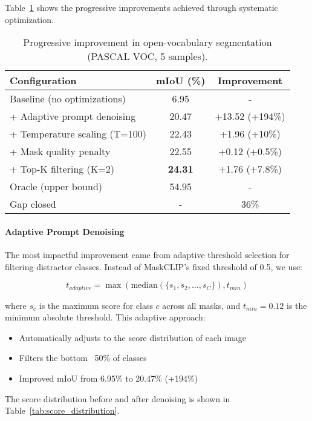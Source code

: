 Table~\ref{tab:optimization_progressive} shows the progressive improvements achieved through systematic optimization.

\begin{table}[h]
\centering
\caption{Progressive improvement in open-vocabulary segmentation (PASCAL VOC, 5 samples).}
\label{tab:optimization_progressive}
\begin{tabular}{lcc}
\hline
\textbf{Configuration} & \textbf{mIoU (\%)} & \textbf{Improvement} \\
\hline
Baseline (no optimizations) & 6.95 & - \\
+ Adaptive prompt denoising & 20.47 & +13.52 (+194\%) \\
+ Temperature scaling (T=100) & 22.43 & +1.96 (+10\%) \\
+ Mask quality penalty & 22.55 & +0.12 (+0.5\%) \\
+ Top-K filtering (K=2) & \textbf{24.31} & +1.76 (+7.8\%) \\
\hline
Oracle (upper bound) & 54.95 & - \\
Gap closed & - & 36\% \\
\hline
\end{tabular}
\end{table}

\paragraph{Adaptive Prompt Denoising}
The most impactful improvement came from adaptive threshold selection for filtering distractor classes. Instead of MaskCLIP's fixed threshold of 0.5, we use:

\begin{equation}
t_{adaptive} = \max\left(\text{median}(\{s_1, s_2, \ldots, s_C\}), t_{min}\right)
\end{equation}

where $s_c$ is the maximum score for class $c$ across all masks, and $t_{min} = 0.12$ is the minimum absolute threshold. This adaptive approach:
\begin{itemize}
    \item Automatically adjusts to the score distribution of each image
    \item Filters the bottom ~50\% of classes
    \item Improved mIoU from 6.95\% to 20.47\% (+194\%)
\end{itemize}

The score distribution before and after denoising is shown in Table~\ref{tab:score_distribution}.

